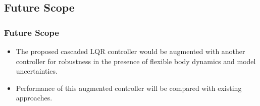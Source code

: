 \documentclass[10pt]{beamer}
\begin{document}
\subsection{Future Scope}
\begin{frame}
 \frametitle{Future Scope}
 \begin{itemize}
 \item  The proposed cascaded LQR controller would be augmented with another controller for robustness in the presence of flexible body dynamics and model uncertainties. \bigskip
  \item Performance of this augmented controller will be compared with existing approaches.\bigskip
 \end{itemize}
\end{frame}
\end{document}
